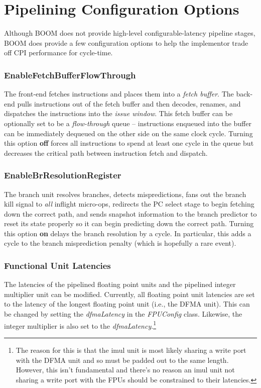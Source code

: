 \section{Pipelining Configuration Options}

Although BOOM does not provide high-level configurable-latency pipeline stages, BOOM does provide a few configuration options to help the implementor trade off CPI performance for cycle-time. 

\subsubsection{EnableFetchBufferFlowThrough}

The front-end fetches instructions and places them into a {\em fetch buffer}.  The back-end pulls instructions out of the fetch buffer and then decodes, renames, and dispatches the instructions into the {\em issue window}. This fetch buffer can be optionally set to be a {\em flow-through} queue -- instructions enqueued into the buffer can be immediately dequeued on the other side on the same clock cycle.  Turning this option {\bf off} forces all instructions to spend at least one cycle in the queue but decreases the critical path between instruction fetch and dispatch.

\subsubsection{EnableBrResolutionRegister}

The branch unit resolves branches, detects mispredictions, fans out the branch kill signal to {\em all} inflight micro-ops, redirects the PC select stage to begin fetching down the correct path, and sends snapshot information to the branch predictor to reset its state properly so it can begin predicting down the correct path.  Turning this option {\bf on} delays the branch resolution by a cycle.  In particular, this adds a cycle to the branch misprediction penalty (which is hopefully a rare event).

\subsubsection{Functional Unit Latencies}

The latencies of the pipelined floating point units and the pipelined integer multiplier unit can be modified.  Currently, all floating point unit latencies are set to the latency of the longest floating point unit (i.e., the DFMA unit).  This can be changed by setting the {\em dfmaLatency} in the {\em FPUConfig} class. Likewise, the integer multiplier is also set to the {\em dfmaLatency}.\footnote{The reason for this is that the imul unit is most likely sharing a write port with the DFMA unit and so must be padded out to the same length. However, this isn't fundamental and there's no reason an imul unit not sharing a write port with the FPUs should be constrained to their latencies.}


